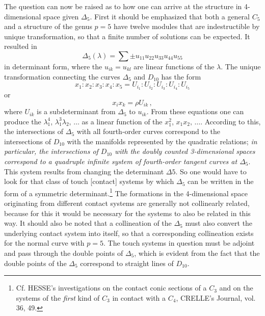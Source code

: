 \documentclass[leqno]{article}
\begin{document}
 The question can now be raised as to how one can arrive at the structure in 4-dimensional space given $\Delta_5$. First it should be emphasized that both a general $C_5$ and a structure of the genus $p=5$ have twelve modules that are indestructible by unique transformation, so that a finite number of solutions can be expected. It resulted in 
\[
\Delta_5(\lambda) = \sum \pm u_{11} u_{22} u_{33} u_{44} u_{55}
\] 
in determinant form, where the $u_{ik}=u_{kl}$ are linear functions of the $\lambda$. The unique transformation connecting the curves $\Delta_5$ and $D_{10}$ has the form 
\[
x_1 : x_2 : x_3 : x_4 : x_5 = U_{i_1} : U_{i_2} : U_{i_3} : U_{i_4} : U_{i_5}
\] 
or 
\[
x_i x_k = \rho U_{ik} \, , 
\] 
where $U_{ik}$ is a subdeterminant from $\Delta_5$ to $u_{ik} $. From these equations one can produce the $\lambda_1^4$, $\lambda_1^3 \lambda_2, \, \dots$ as a linear function of the $x_1^2$, $x_1 x_2, \, \dots$. According to this, the intersections of $\Delta_5$ with all fourth-order curves correspond to the intersections of $D_{10}$ with the manifolds represented by the quadratic relations; \textit{in particular, the intersections of $D_{10}$ with the doubly counted 3-dimensional spaces correspond to a quadruple infinite system of fourth-order tangent curves at $\Delta_5$}. This system results from changing the determinant $\Delta 5$. So one would have to look for that class of touch [contact] systems by which $\Delta_5$ can be written in the form of a symmetric determinant.\footnote{Cf. HESSE's investigations on the contact conic sections of a $C_3$ and on the systems of the \textit{first} kind of $C_3$ in contact with a $C_4$, CRELLE's Journal, vol. 36, 49.} The formations in the 4-dimensional space originating from different contact systems are generally not collinearly related, because for this it would be necessary for the systems to also be related in this way. It should also be noted that a collineation of the $\Delta_5$ must also convert the underlying contact system into itself, so that a corresponding collineation exists for the normal curve with $p=5$. The touch systems in question must be adjoint and pass through the double points of $\Delta_5$, which is evident from the fact that the double points of the $\Delta_5$ correspond to straight lines of $D_{10}$.
\end{document}
